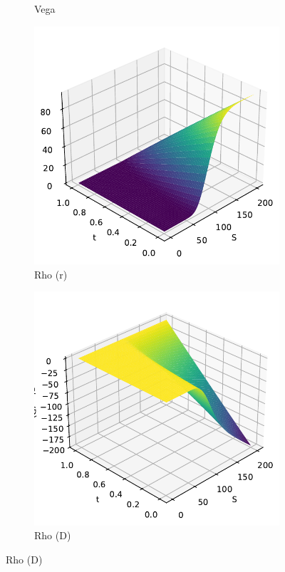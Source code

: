 \begin{figure}[H]
\begin{subfigure}[b]{0.3\linewidth}
        \caption{Vega}
    \end{subfigure}
    \begin{subfigure}[b]{0.3\linewidth}
        \includegraphics[width=\linewidth]{Imagenes/Parte1/6_Sols/Call/Call_Rho_r.pdf}
        \caption{Rho (r)}
    \end{subfigure}
    \begin{subfigure}[b]{0.3\linewidth}
        \includegraphics[width=\linewidth]{Imagenes/Parte1/6_Sols/Call/Call_Rho_D.pdf}
        \caption{Rho (D)}
    \end{subfigure}
\end{figure}


